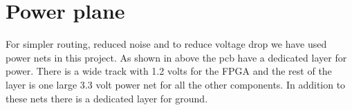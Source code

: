 \section {Power plane}


For simpler routing, reduced noise and to reduce voltage drop we have used power nets in this project.
As shown in above the pcb have a dedicated layer for power.
There is a wide track with 1.2 volts for the FPGA and the rest of the layer is one large 3.3 volt power net for all the other components.
In addition to these nets there is a dedicated layer for ground.

